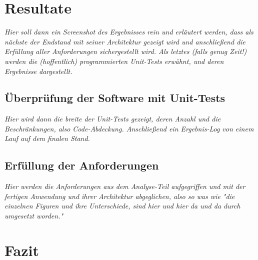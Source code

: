 \section{Resultate}
\label{sec:Resultate}

\emph{Hier soll dann ein Screenshot des Ergebnisses rein und erläutert werden, dass als nächste der Endstand mit seiner Architektur gezeigt wird und anschließend die Erfüllung aller Anforderungen sichergestellt wird. Als letztes (falls genug Zeit!) werden die (hoffentlich) programmierten Unit-Tests erwähnt, und deren Ergebnisse dargestellt.}

\subsection{Überprüfung der Software mit Unit-Tests}
\label{subsec:unittests}

\emph{Hier wird dann die breite der Unit-Tests gezeigt, deren Anzahl und die Beschränkungen, also Code-Abdeckung. Anschließend ein Ergebnis-Log von einem Lauf auf dem finalen Stand.}

\subsection{Erfüllung der Anforderungen}
\label{subsec:erfullung_anforderungen}

\emph{Hier werden die Anforderungen aus dem Analyse-Teil aufgegriffen und mit der fertigen Anwendung und ihrer Architektur abgeglichen, also so was wie "die einzelnen Figuren und ihre Unterschiede, sind hier und hier da und da durch umgesetzt worden."}

\section{Fazit}
\label{sec:Fazit}